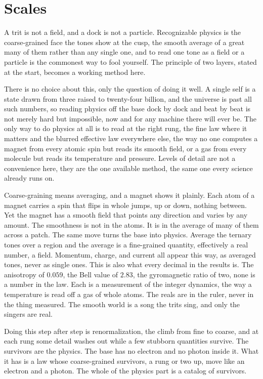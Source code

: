\section{Scales}

A trit is not a field, and a dock is not a particle. Recognizable physics is the coarse-grained face the tones show at the cusp, the smooth average of a great many of them rather than any single one, and to read one tone as a field or a particle is the commonest way to fool yourself. The principle of two layers, stated at the start, becomes a working method here.

There is no choice about this, only the question of doing it well. A single self is a state drawn from three raised to twenty-four billion, and the universe is past all such numbers, so reading physics off the base dock by dock and beat by beat is not merely hard but impossible, now and for any machine there will ever be. The only way to do physics at all is to read at the right rung, the fine law where it matters and the blurred effective law everywhere else, the way no one computes a magnet from every atomic spin but reads its smooth field, or a gas from every molecule but reads its temperature and pressure. Levels of detail are not a convenience here, they are the one available method, the same one every science already runs on.

Coarse-graining means averaging, and a magnet shows it plainly. Each atom of a magnet carries a spin that flips in whole jumps, up or down, nothing between. Yet the magnet has a smooth field that points any direction and varies by any amount. The smoothness is not in the atoms. It is in the average of many of them across a patch. The same move turns the base into physics. Average the ternary tones over a region and the average is a fine-grained quantity, effectively a real number, a field. Momentum, charge, and current all appear this way, as averaged tones, never as single ones. This is also what every decimal in the results is. The anisotropy of $0.059$, the Bell value of $2.83$, the gyromagnetic ratio of two, none is a number in the law. Each is a measurement of the integer dynamics, the way a temperature is read off a gas of whole atoms. The reals are in the ruler, never in the thing measured. The smooth world is a song the trits sing, and only the singers are real.

Doing this step after step is renormalization, the climb from fine to coarse, and at each rung some detail washes out while a few stubborn quantities survive. The survivors are the physics. The base has no electron and no photon inside it. What it has is a law whose coarse-grained survivors, a rung or two up, move like an electron and a photon. The whole of the physics part is a catalog of survivors.

